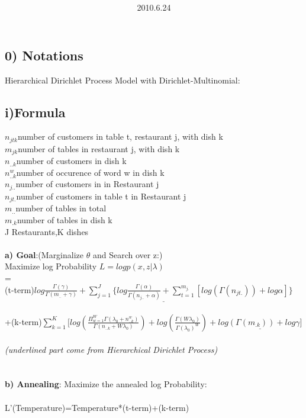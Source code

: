 \documentclass{article}
\title{\vspace{0.3in}\textmd{\textbf{\hmwkTitle}}}
\date{2010.6.24}
\author{\textbf{\hmwkAuthorName}}
\begin{document}
\begin{spacing}{1.1}
\maketitle
\section{0) Notations }
Hierarchical Dirichlet Process Model with Dirichlet-Multinomial:
\subsection{i)Formula}
$n_{jtk}$number of customers in table t, restaurant j, with dish k \\
$m_{jk}$number of tables in restaurant j, with dish k \\ 
$n_{..k}$number of customers in dish k \\
$n_{..k}^{w}$number of occurence of word w in dish k \\
$n_{j..}$number of customers in in Restaurant j \\
$n_{jt.}$number of customers in table t in Restaurant j \\
$m_{..}$number of tables in total \\
$m_{.k}$number of tables in dish k \\ 
J Restaurants,K dishes\\ \\
{\bf a) Goal}:(Marginalize $\theta$ and Search over z:)\\
 Maximize log Probability $L=log p(x,z|\lambda)$\\ =\\
(t-term)$ \underline{log \frac{\Gamma(\gamma)}{\Gamma(m_{..}+\gamma)}+\sum_{j=1}^{J} \{log \frac{\Gamma(\alpha)}{\Gamma(n_{j..}+\alpha)}+\sum_{t=1}^{m_{j.}}[log(\Gamma(n_{jt.}))+log \alpha
]\}}$\\ \\
+(k-term)$ \sum_{k=1}^{K} [log(\frac{\Pi_{w=1}^{W}\Gamma(\lambda_{0}+n_{..k}^{w})}{\Gamma(n_{..k}+W\lambda_{0})})+log(\frac{\Gamma(W\lambda_{0})}{\Gamma(\lambda_{0})^{W}})
+\underline{log(\Gamma(m_{.k}))+log \gamma]}$\\ \\ \emph{{\small (underlined part come from Hierarchical Dirichlet Process)}}\\ \\ \\
{\bf b) Annealing}: Maximize the annealed log Probability:\\ \\
L'(Temperature)=Temperature*(t-term)+(k-term)


\end{spacing}
\end{document}
